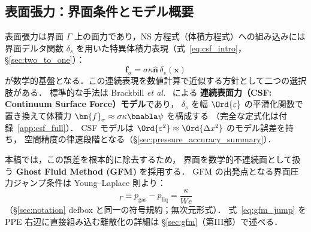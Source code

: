 %
%
\label{eq:young-laplace}%
\label{eq:Heps_def_preview}%
\label{eq:delta_eps_def}%
\subsection{表面張力：界面条件とモデル概要}
\label{sec:csf}

表面張力は界面 $\Gamma$ 上の面力であり，NS 方程式（体積方程式）への組み込みには
界面デルタ関数 $\delta_s$ を用いた特異体積力表現（式~\eqref{eq:csf_intro}，§\ref{sec:two_to_one}）：
\begin{equation*}
  \bm{f}_\sigma = \sigma\kappa\hat{\bm{n}}\,\delta_s(\bm{x})
\end{equation*}
が数学的基盤となる．この連続表現を数値計算で近似する方針として二つの選択肢がある．
標準的な手法は Brackbill \textit{et al.}~\cite{Brackbill1992} による
\textbf{連続表面力（CSF: Continuum Surface Force）モデル}であり，
$\delta_s$ を幅 $\Ord{\varepsilon}$ の平滑化関数で置き換えて体積力
$\bm{f}_\sigma \approx \sigma\kappa\bnabla\psi$ を構成する
（完全な定式化は付録~\ref{app:csf_full}）．
CSF モデルは $\Ord{\varepsilon^2} \approx \Ord{\Delta x^2}$ のモデル誤差を持ち，
空間精度の律速段階となる（§\ref{sec:pressure_accuracy_summary}）．

本稿では，この誤差を根本的に除去するため，
界面を数学的不連続面として扱う \textbf{Ghost Fluid Method (GFM)} \cite{Fedkiw1999} を採用する．
GFM の出発点となる界面圧力ジャンプ条件は Young--Laplace 則より：
\begin{equation}
  [p]_\Gamma \equiv p_\text{gas} - p_\text{liq} = \frac{\kappa}{We}
  \label{eq:gfm_jump}
\end{equation}
（§\ref{sec:notation} defbox と同一の符号規約；無次元形式）．
式~\eqref{eq:gfm_jump} を PPE 右辺に直接組み込む離散化の詳細は
§\ref{sec:gfm}（第III部）で述べる．

